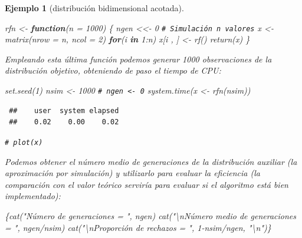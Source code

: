 \documentclass[
  10pt,
]{book}
\newenvironment{Shaded}{\begin{snugshade}}{\end{snugshade}}
\newcommand{\AttributeTok}[1]{\textcolor[rgb]{0.77,0.63,0.00}{#1}}
\newcommand{\CommentTok}[1]{\textcolor[rgb]{0.56,0.35,0.01}{\textit{#1}}}
\newcommand{\ControlFlowTok}[1]{\textcolor[rgb]{0.13,0.29,0.53}{\textbf{#1}}}
\newcommand{\DecValTok}[1]{\textcolor[rgb]{0.00,0.00,0.81}{#1}}
\newcommand{\FunctionTok}[1]{\textcolor[rgb]{0.00,0.00,0.00}{#1}}
\newcommand{\NormalTok}[1]{#1}
\newcommand{\OtherTok}[1]{\textcolor[rgb]{0.56,0.35,0.01}{#1}}
\newcommand{\SpecialCharTok}[1]{\textcolor[rgb]{0.00,0.00,0.00}{#1}}
\newcommand{\StringTok}[1]{\textcolor[rgb]{0.31,0.60,0.02}{#1}}
\theoremstyle{break}
\newtheorem{example}{Ejemplo}[chapter]
\theoremstyle{nonumberplain}
\renewcommand{\CommentTok}[1]{\textcolor[rgb]{0.41,0.41,0.41}{\texttt{#1}}}
\begin{document}
\begin{example}[distribución bidimensional acotada]
\begin{Shaded}
\begin{Highlighting}[]
\NormalTok{rfn }\OtherTok{\textless{}{-}} \ControlFlowTok{function}\NormalTok{(}\AttributeTok{n =} \DecValTok{1000}\NormalTok{) \{}
\NormalTok{  ngen }\OtherTok{\textless{}\textless{}{-}} \DecValTok{0}
  \CommentTok{\# Simulación n valores}
\NormalTok{  x }\OtherTok{\textless{}{-}} \FunctionTok{matrix}\NormalTok{(}\AttributeTok{nrow =}\NormalTok{ n, }\AttributeTok{ncol =} \DecValTok{2}\NormalTok{)}
  \ControlFlowTok{for}\NormalTok{(i }\ControlFlowTok{in} \DecValTok{1}\SpecialCharTok{:}\NormalTok{n) x[i , ] }\OtherTok{\textless{}{-}} \FunctionTok{rf}\NormalTok{()}
  \FunctionTok{return}\NormalTok{(x)}
\NormalTok{\}}
\end{Highlighting}
\end{Shaded}

Empleando esta última función podemos generar 1000 observaciones de la
distribución objetivo, obteniendo de paso el tiempo de CPU:

\begin{Shaded}
\begin{Highlighting}[]
\FunctionTok{set.seed}\NormalTok{(}\DecValTok{1}\NormalTok{)}
\NormalTok{nsim }\OtherTok{\textless{}{-}} \DecValTok{1000}
\CommentTok{\# ngen \textless{}{-} 0}
\FunctionTok{system.time}\NormalTok{(x }\OtherTok{\textless{}{-}} \FunctionTok{rfn}\NormalTok{(nsim))}
\end{Highlighting}
\end{Shaded}

\begin{verbatim}
 ##    user  system elapsed 
 ##    0.02    0.00    0.02
\end{verbatim}

\begin{Shaded}
\begin{Highlighting}[]
\CommentTok{\# plot(x)}
\end{Highlighting}
\end{Shaded}

Podemos obtener el número medio de generaciones de la distribución auxiliar
(la aproximación por simulación) y utilizarlo para evaluar la eficiencia
(la comparación con el valor teórico serviría para evaluar si el algoritmo
está bien implementado):

\begin{Shaded}
\begin{Highlighting}[]
\NormalTok{\{}\FunctionTok{cat}\NormalTok{(}\StringTok{"Número de generaciones = "}\NormalTok{, ngen)}
\FunctionTok{cat}\NormalTok{(}\StringTok{"}\SpecialCharTok{\textbackslash{}n}\StringTok{Número medio de generaciones = "}\NormalTok{, ngen}\SpecialCharTok{/}\NormalTok{nsim)}
\FunctionTok{cat}\NormalTok{(}\StringTok{"}\SpecialCharTok{\textbackslash{}n}\StringTok{Proporción de rechazos = "}\NormalTok{, }\DecValTok{1}\SpecialCharTok{{-}}\NormalTok{nsim}\SpecialCharTok{/}\NormalTok{ngen, }\StringTok{"}\SpecialCharTok{\textbackslash{}n}\StringTok{"}\NormalTok{)\}}
\end{Highlighting}
\end{Shaded}


\end{example}
\end{document}
